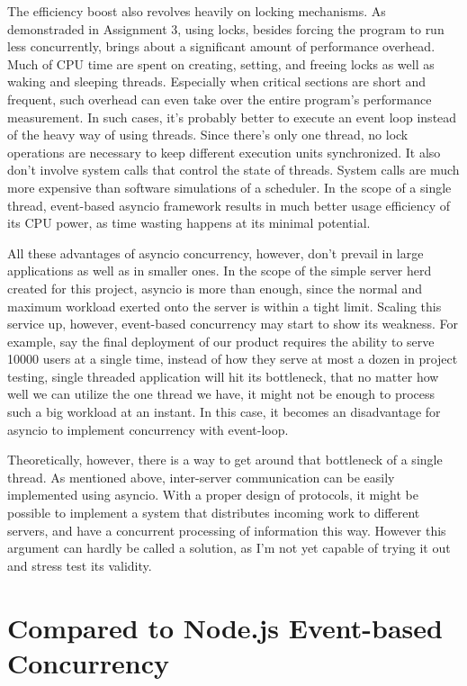 \documentclass[letterpaper,twocolumn,10pt]{article}
\begin{document}
The efficiency boost also revolves heavily on locking mechanisms. 
As demonstraded in Assignment 3, using locks, besides forcing the program to run less concurrently, brings about a significant amount of performance overhead.
Much of CPU time are spent on creating, setting, and freeing locks as well as waking and sleeping threads. 
Especially when critical sections are short and frequent, such overhead can even take over the entire program's performance measurement.
In such cases, it's probably better to execute an event loop instead of the heavy way of using threads. 
Since there's only one thread, no lock operations are necessary to keep different execution units synchronized. 
It also don't involve system calls that control the state of threads.
System calls are much more expensive than software simulations of a scheduler.
In the scope of a single thread, event-based asyncio framework results in much better usage efficiency of its CPU power, as time wasting happens at its minimal potential.

All these advantages of asyncio concurrency, however, don't prevail in large applications as well as in smaller ones.
In the scope of the simple server herd created for this project, asyncio is more than enough, since the normal and maximum workload exerted onto the server is within a tight limit.
Scaling this service up, however, event-based concurrency may start to show its weakness.
For example, say the final deployment of our product requires the ability to serve 10000 users at a single time, instead of how they serve at most a dozen in project testing, single threaded application will hit its bottleneck, that no matter how well we can utilize the one thread we have, it might not be enough to process such a big workload at an instant.
In this case, it becomes an disadvantage for asyncio to implement concurrency with event-loop.

Theoretically, however, there is a way to get around that bottleneck of a single thread.
As mentioned above, inter-server communication can be easily implemented using asyncio.
With a proper design of protocols, it might be possible to implement a system that distributes incoming work to different servers, and have a concurrent processing of information this way.
However this argument can hardly be called a solution, as I'm not yet capable of trying it out and stress test its validity.

\section{Compared to Node.js Event-based Concurrency}
\end{document}
